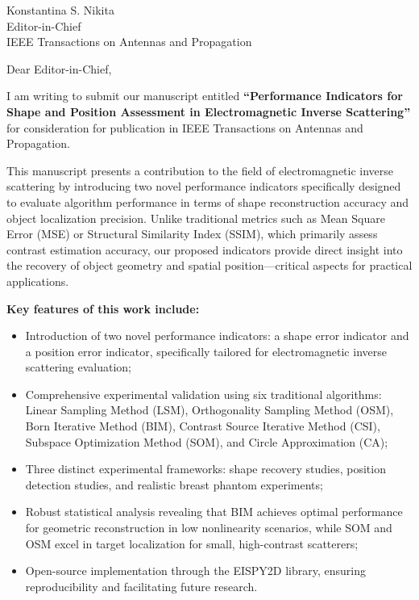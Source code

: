 \documentclass[11pt]{letter}
\begin{document}
\date{\today}

\begin{letter}{
Konstantina S. Nikita\\
Editor-in-Chief\\
IEEE Transactions on Antennas and Propagation\\
}

\opening{Dear Editor-in-Chief,}

I am writing to submit our manuscript entitled \textbf{``Performance Indicators for Shape and Position Assessment in Electromagnetic Inverse Scattering''} for consideration for publication in IEEE Transactions on Antennas and Propagation.

This manuscript presents a contribution to the field of electromagnetic inverse scattering by introducing two novel performance indicators specifically designed to evaluate algorithm performance in terms of shape reconstruction accuracy and object localization precision. Unlike traditional metrics such as Mean Square Error (MSE) or Structural Similarity Index (SSIM), which primarily assess contrast estimation accuracy, our proposed indicators provide direct insight into the recovery of object geometry and spatial position—critical aspects for practical applications.

\textbf{Key features of this work include:}

\begin{itemize}
    \item Introduction of two novel performance indicators: a shape error indicator and a position error indicator, specifically tailored for electromagnetic inverse scattering evaluation;
    \item Comprehensive experimental validation using six traditional algorithms: Linear Sampling Method (LSM), Orthogonality Sampling Method (OSM), Born Iterative Method (BIM), Contrast Source Iterative Method (CSI), Subspace Optimization Method (SOM), and Circle Approximation (CA);
    \item Three distinct experimental frameworks: shape recovery studies, position detection studies, and realistic breast phantom experiments;
    \item Robust statistical analysis revealing that BIM achieves optimal performance for geometric reconstruction in low nonlinearity scenarios, while SOM and OSM excel in target localization for small, high-contrast scatterers;
    \item Open-source implementation through the EISPY2D library, ensuring reproducibility and facilitating future research.
\end{itemize}


\end{letter}
\end{document}
